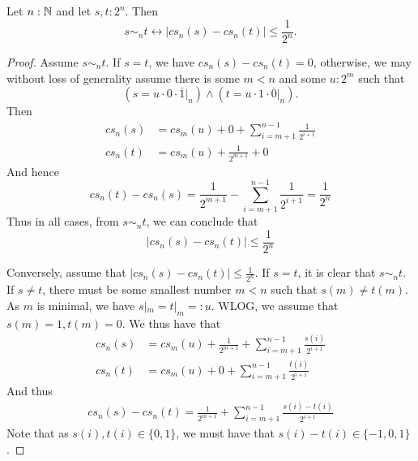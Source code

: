 \begin{lemma}\label{alternativeSimByCauchyDistance}
  Let $n:\mathbb{N}$ and let $s,t:2^n$. Then 
  \begin{equation}
    s\sim_n t \leftrightarrow |cs_n(s) - cs_n(t)| \leq \frac{1}{2^{n}}.
  \end{equation} 
\end{lemma}

\begin{proof}
  \item  
    Assume $ s \sim_n t$. If $s=t$, we have $cs_n(s) - cs_n(t) = 0$, 
    otherwise, we may without loss of generality assume there is some $m<n$ and some $u:2^m$ such that 
  \begin{equation}
    (s = u \cdot 0 \cdot \overline 1|_n) \wedge ( t = u \cdot 1 \cdot \overline 0 |_n) . 
  \end{equation}
  Then 
  \begin{align}
    cs_n(s) &= 
    cs_m(u) + 0 + \sum\limits_{i = m+1}^{n-1} \frac{1}{2^{i+1}}\\
    cs_n(t) &= 
    cs_m(u) + \frac{1}{2^{m+1}} + 0  
  \end{align}
  And hence 
  \begin{equation}
    cs_n(t) - cs_n(s) = \frac{1}{2^{m+1}} - \sum\limits_{i = m+1}^{n-1} \frac{1}{2^{i+1}} = \frac{1}{2^n}
  \end{equation}
  Thus in all cases, from $s\sim_n t$, we can conclude that 
  \begin{equation}
    |cs_n(s) -cs_n(t) |\leq \frac{1}{2^n}
  \end{equation}
  \item 
  Conversely, assume that $|cs_n(s) - cs_n(t)| \leq \frac{1}{2^n}$. 
  If $s = t$, it is clear that $s \sim_n t$.
  If $s\neq t$, there must be some smallest number $m<n$ such that 
  $s(m) \neq t(m)$. As $m$ is minimal, we have $s|_m = t|_m = : u$. 
  WLOG, we assume that $s(m) = 1, t(m) = 0$. 
  We thus have that 
  \begin{align}
    cs_n(s) &= 
    cs_m(u) + \frac1{2^{m+1}} + \sum\limits_{i = m+1}^{n-1} \frac{s(i)}{2^{i+1}}\\
    cs_n(t) &= 
    cs_m(u) + 0  + \sum\limits_{i = m+1}^{n-1} \frac{t(i)}{2^{i+1}}
  \end{align}
  And thus 
  \begin{align}
    cs_n(s)-cs_n(t) = \frac{1}{2^{m+1}} + \sum\limits_{i = m+1}^{n-1} \frac{s(i)-t(i)}{2^{i+1}}
  \end{align}
  Note that as $s(i),t(i) \in \{0,1\}$, we must have that $s(i) -t(i) \in \{-1,0,1\}$. 

\end{proof}

